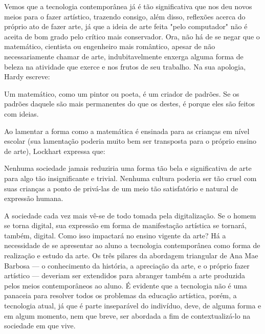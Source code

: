 \documentclass[12pt, a4paper]{article}
\begin{document}
Vemos que a tecnologia contemporânea já é tão significativa que nos deu novos meios para o fazer artístico, trazendo consigo, além disso, reflexões acerca do próprio ato de fazer arte, já que a ideia de arte feita "pelo computador" não é aceita de bom grado pelo crítico
mais conservador.
Ora, não há de se negar que o matemático, cientista ou engenheiro mais romântico, apesar de não necessariamente chamar de arte, indubitavelmente enxerga alguma forma de beleza na atividade que exerce e nos frutos de seu trabalho. 
Na sua apologia, Hardy escreve:

\begin{displayquote}
Um matemático, como um pintor ou poeta, é um criador de padrões. Se os padrões daquele são mais permanentes do que os destes, é porque eles são feitos com ideias.
\cite{hardy_apology}
\end{displayquote}

Ao lamentar a forma como a matemática é ensinada para as crianças em nível escolar (sua lamentação poderia muito bem ser transposta para o próprio ensino de arte), Lockhart expressa que:

\begin{displayquote}
Nenhuma sociedade jamais reduziria uma forma tão bela e significativa de arte para algo tão insignificante e trivial. Nenhuma cultura poderia ser tão cruel com suas crianças a ponto de privá-las de um meio tão satisfatório e natural de expressão humana.
\cite{lockhart_lament}
\end{displayquote}

A sociedade cada vez mais vê-se de todo tomada pela digitalização. Se o homem se torna digital, sua expressão em forma de 
manifestação artística se tornará, também, digital. Como isso impactará no ensino vigente da arte?
Há a necessidade de se apresentar ao aluno a tecnologia contemporânea como forma de realização e estudo da arte.
Os três pilares da abordagem triangular de Ana Mae Barbosa --- o conhecimento da história, a apreciação da arte, e o próprio fazer artístico ---
deveriam ser extendidos para abranger também a arte produzida pelos meios contemporâneos ao aluno.
É evidente que a tecnologia não é uma panaceia para resolver todos os problemas da educação artística, porém, a tecnologia atual, já que é parte
inseparável do indivíduo, deve, de alguma forma e em algum momento, nem que breve, ser abordada a fim de contextualizá-lo na sociedade em que vive.

\end{document}
